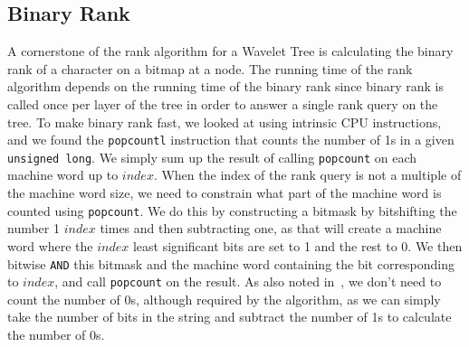 \subsection{Binary Rank}
A cornerstone of the rank algorithm for a Wavelet Tree is calculating the binary rank of a character on a bitmap at a node. The running time of the rank algorithm depends on the running time of the binary rank since binary rank is called once per layer of the tree in order to answer a single rank query on the tree.
To make binary rank fast, we looked at using intrinsic CPU instructions, and we found the \texttt{popcountl} instruction that counts the number of 1s in a given \texttt{unsigned long}.
We simply sum up the result of calling \texttt{popcount} on each machine word up to $index$.
When the index of the rank query is not a multiple of the machine word size, we need to constrain what part of the machine word is counted using \texttt{popcount}.
We do this by constructing a bitmask by bitshifting the number 1 $index$ times and then subtracting one, as that will create a machine word where the $index$ least significant bits are set to 1 and the rest to 0.
We then bitwise \texttt{AND} this bitmask and the machine word containing the bit corresponding to $index$, and call \texttt{popcount} on the result.
As also noted in~\citep{Navjda13}, we don't need to count the number of 0s, although required by the algorithm, as we can simply take the number of bits in the string and subtract the number of 1s to calculate the number of 0s.


